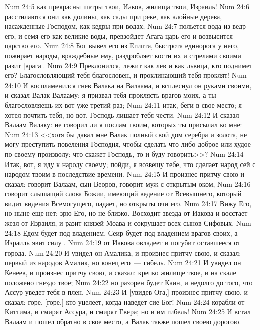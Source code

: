 \vs Num 24:5 как прекрасны шатры твои, Иаков, жилища твои, Израиль!
\vs Num 24:6 расстилаются они как долины, как сады при реке, как алойные дерева, насажденные Господом, как кедры при водах;
\vs Num 24:7 польется вода из ведр его, и семя его  как великие воды, превзойдет Агага царь его и возвысится царство его.
\vs Num 24:8 Бог вывел его из Египта, быстрота единорога у него, пожирает народы, враждебные ему, раздробляет кости их и стрелами своими разит [врага].
\vs Num 24:9 Преклонился, лежит как лев и как львица, кто поднимет его? Благословляющий тебя благословен, и проклинающий тебя проклят!
\rsbpar\vs Num 24:10 И воспламенился гнев Валака на Валаама, и всплеснул он руками своими, и сказал Валак Валааму: я призвал тебя проклясть врагов моих, а ты благословляешь их вот уже третий раз;
\vs Num 24:11 итак, беги в свое место; я хотел почтить тебя, но вот, Господь лишает тебя чести.
\vs Num 24:12 И сказал Валаам Валаку: не говорил ли я послам твоим, которых ты присылал ко мне:
\vs Num 24:13 <<хотя бы давал мне Валак полный свой дом серебра и золота, не могу преступить повеления Господня, чтобы сделать что-либо доброе или худое по своему произволу: что скажет Господь, то и буду говорить>>?
\vs Num 24:14 Итак, вот, я иду к народу своему; пойди, я возвещу тебе, что сделает народ сей с народом твоим в последствие времени.
\vs Num 24:15 И произнес притчу свою и сказал: говорит Валаам, сын Веоров, говорит муж с открытым оком,
\vs Num 24:16 говорит слышащий слова Божии, имеющий ведение от Всевышнего, который видит видения Всемогущего, падает, но открыты очи его.
\vs Num 24:17 Вижу Его, но ныне еще нет; зрю Его, но не близко. Восходит звезда от Иакова и восстает жезл от Израиля, и разит князей Моава и сокрушает всех сынов Сифовых.
\vs Num 24:18 Едом будет под владением, Сеир будет под владением врагов своих, а Израиль явит силу .
\vs Num 24:19  от Иакова овладеет и погубит оставшееся от города.
\vs Num 24:20 И увидел он Амалика, и произнес притчу свою, и сказал: первый из народов Амалик, но конец его~--- гибель.
\vs Num 24:21 И увидел он Кенеев, и произнес притчу свою, и сказал: крепко жилище твое, и на скале положено гнездо твое;
\vs Num 24:22 но разорен будет Каин, и недолго до того, что Ассур уведет тебя в плен.
\vs Num 24:23 И [увидев Ога,] произнес притчу свою, и сказал: горе, [горе,] кто уцелеет, когда наведет сие Бог!
\vs Num 24:24  корабли от Киттима, и смирят Ассура, и смирят Евера; но и им гибель!
\vs Num 24:25 И встал Валаам и пошел обратно в свое место, а Валак также пошел своею дорогою.

